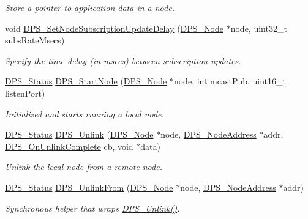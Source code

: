 \begin{DoxyCompactItemize}
\begin{DoxyCompactList}\small\item\em Store a pointer to application data in a node. \end{DoxyCompactList}\item 
void \hyperlink{group__node_gac7e33476c06009ed42a6ea6f3c53380a}{D\+P\+S\+\_\+\+Set\+Node\+Subscription\+Update\+Delay} (\hyperlink{group__node_ga4dd612ab965134321bb57fdb065f121c}{D\+P\+S\+\_\+\+Node} $\ast$node, uint32\+\_\+t subs\+Rate\+Msecs)
\begin{DoxyCompactList}\small\item\em Specify the time delay (in msecs) between subscription updates. \end{DoxyCompactList}\item 
\hyperlink{group__status_ga30395a84d3cad9d4ec29848106415038}{D\+P\+S\+\_\+\+Status} \hyperlink{group__node_ga160d504bfaeb0d3711e0259000340fe3}{D\+P\+S\+\_\+\+Start\+Node} (\hyperlink{group__node_ga4dd612ab965134321bb57fdb065f121c}{D\+P\+S\+\_\+\+Node} $\ast$node, int mcast\+Pub, uint16\+\_\+t listen\+Port)
\begin{DoxyCompactList}\small\item\em Initialized and starts running a local node. \end{DoxyCompactList}\item 
\hyperlink{group__status_ga30395a84d3cad9d4ec29848106415038}{D\+P\+S\+\_\+\+Status} \hyperlink{group__node_ga79c86c3c0c5d6438b953a9acaab0ab0b}{D\+P\+S\+\_\+\+Unlink} (\hyperlink{group__node_ga4dd612ab965134321bb57fdb065f121c}{D\+P\+S\+\_\+\+Node} $\ast$node, \hyperlink{group__nodeaddress_ga9e9f56aa38e82b4edcef7eb81e9f5bd2}{D\+P\+S\+\_\+\+Node\+Address} $\ast$addr, \hyperlink{group__node_ga70b98e7cc39f0dccdba41f0984de82f6}{D\+P\+S\+\_\+\+On\+Unlink\+Complete} cb, void $\ast$data)
\begin{DoxyCompactList}\small\item\em Unlink the local node from a remote node. \end{DoxyCompactList}\item 
\hyperlink{group__status_ga30395a84d3cad9d4ec29848106415038}{D\+P\+S\+\_\+\+Status} \hyperlink{group__node_ga2d5bb0528c2a171991ad6355cbadac69}{D\+P\+S\+\_\+\+Unlink\+From} (\hyperlink{group__node_ga4dd612ab965134321bb57fdb065f121c}{D\+P\+S\+\_\+\+Node} $\ast$node, \hyperlink{group__nodeaddress_ga9e9f56aa38e82b4edcef7eb81e9f5bd2}{D\+P\+S\+\_\+\+Node\+Address} $\ast$addr)
\begin{DoxyCompactList}\small\item\em Synchronous helper that wraps \hyperlink{group__node_ga79c86c3c0c5d6438b953a9acaab0ab0b}{D\+P\+S\+\_\+\+Unlink()}. \end{DoxyCompactList}\end{DoxyCompactItemize}


